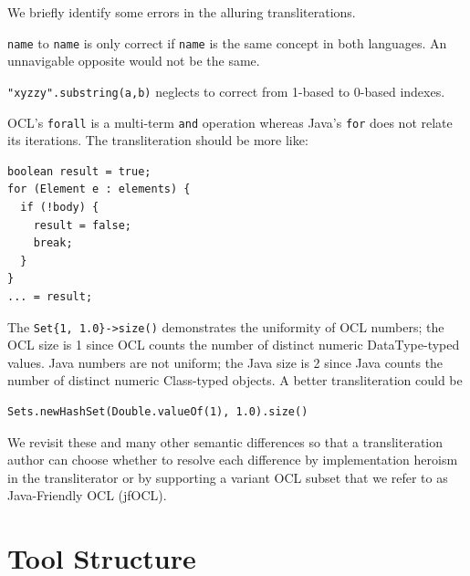 \documentclass[sigconf]{acmart}
\begin{document}
We briefly identify some errors in the alluring transliterations.

\verb|name| to \verb|name| is only correct if \verb|name| is the same concept in both languages. An unnavigable opposite would not be the same.

\verb|"xyzzy".substring(a,b)| neglects to correct from 1-based to 0-based indexes.

OCL's \verb|forall| is a multi-term \verb|and| operation whereas Java's \verb|for| does not relate its iterations. The transliteration should be more like:

\begin{verbatim}
boolean result = true;
for (Element e : elements) {
  if (!body) {
    result = false;
    break;
  }
}
... = result;
\end{verbatim} 

The \verb|Set{1, 1.0}->size()| demonstrates the uniformity of OCL numbers; the OCL size is 1 since OCL counts the number of distinct numeric DataType-typed  values. Java numbers are not uniform; the Java size is 2 since Java counts the number of distinct numeric Class-typed objects. A better transliteration could be

\begin{verbatim}
Sets.newHashSet(Double.valueOf(1), 1.0).size()
\end{verbatim} 

We revisit these and many other semantic differences so that a transliteration author can choose whether to resolve each difference by implementation heroism in the transliterator or by supporting a variant OCL subset that we refer to as Java-Friendly OCL (jfOCL).





\section{Tool Structure}\label{Tool Structure}
\end{document}
